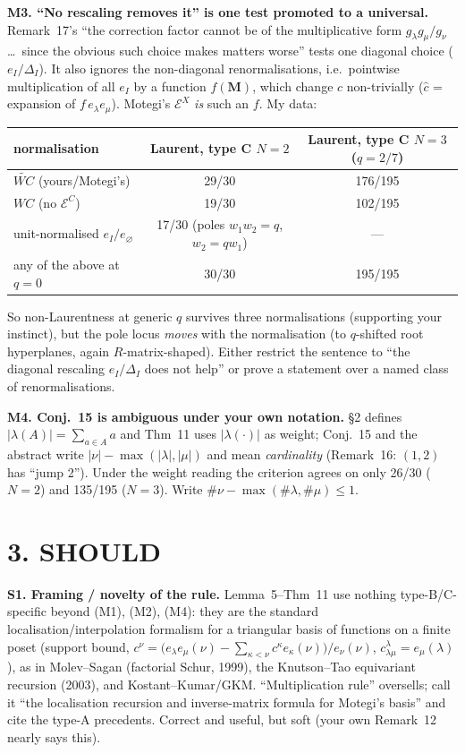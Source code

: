 \documentclass[11pt]{article}
\begin{document}
\textbf{M3. ``No rescaling removes it'' is one test promoted to a universal.} Remark~17's ``the correction factor cannot be of the
multiplicative form $g_\lambda g_\mu/g_\nu$ \dots\ since the obvious such choice makes matters worse'' tests one diagonal choice
($e_I/\Delta_I$). It also ignores the non-diagonal renormalisations, i.e.\ pointwise multiplication of all $e_I$ by a function $f(\mathbf M)$,
which change $c$ non-trivially ($\hat c$ = expansion of $f\,e_\lambda e_\mu$). Motegi's $\mathcal E^X$ \emph{is} such an $f$. My data:
\begin{center}\begin{tabular}{lcc}\toprule
normalisation & Laurent, type C $N=2$ & Laurent, type C $N=3$ ($q=2/7$)\\\midrule
$\widetilde{WC}$ (yours/Motegi's) & 29/30 & 176/195\\
$WC$ (no $\mathcal E^C$) & 19/30 & 102/195\\
unit-normalised $e_I/e_\varnothing$ & 17/30 (poles $w_1w_2=q$, $w_2=qw_1$) & ---\\
any of the above at $q=0$ & 30/30 & 195/195\\\bottomrule
\end{tabular}\end{center}
So non-Laurentness at generic $q$ survives three normalisations (supporting your instinct), but the pole locus \emph{moves} with the
normalisation (to $q$-shifted root hyperplanes, again $R$-matrix-shaped). Either restrict the sentence to ``the diagonal rescaling
$e_I/\Delta_I$ does not help'' or prove a statement over a named class of renormalisations.

\textbf{M4. Conj.~15 is ambiguous under your own notation.} \S2 defines $|\lambda(A)|=\sum_{a\in A}a$ and Thm~11 uses
$|\lambda(\cdot)|$ as weight; Conj.~15 and the abstract write $|\nu|-\max(|\lambda|,|\mu|)$ and mean \emph{cardinality}
(Remark~16: $(1,2)$ has ``jump 2''). Under the weight reading the criterion agrees on only 26/30 ($N=2$) and 135/195 ($N=3$).
Write $\#\nu-\max(\#\lambda,\#\mu)\le 1$.

\section*{3. SHOULD}
\textbf{S1. Framing / novelty of the rule.} Lemma~5--Thm~11 use nothing type-B/C-specific beyond (M1), (M2), (M4): they are the
standard localisation/interpolation formalism for a triangular basis of functions on a finite poset (support bound,
$c^\nu=\bigl(e_\lambda e_\mu(\nu)-\sum_{\kappa<\nu}c^\kappa e_\kappa(\nu)\bigr)/e_\nu(\nu)$, $c^\lambda_{\lambda\mu}=e_\mu(\lambda)$),
as in Molev--Sagan (factorial Schur, 1999), the Knutson--Tao equivariant recursion (2003), and Kostant--Kumar/GKM.
``Multiplication rule'' oversells; call it ``the localisation recursion and inverse-matrix formula for Motegi's basis'' and cite the
type-A precedents. Correct and useful, but soft (your own Remark~12 nearly says this).
\end{document}
